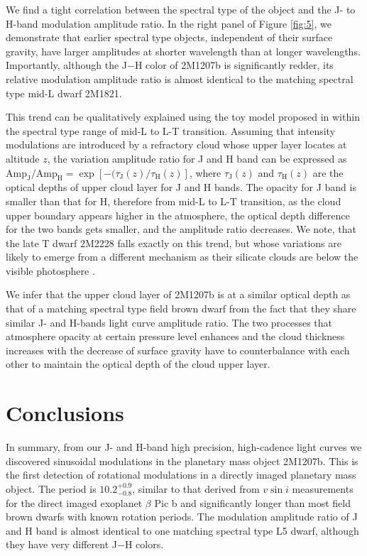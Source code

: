 \documentclass[apj]{emulateapj}
\newcommand{\bpic}{$\beta$ Pic}
\newcommand{\vsini}{$v\sin i$}
\begin{document}
We find a tight correlation between the spectral type of the object
and the J- to H-band modulation amplitude ratio. In the right panel of
Figure \ref{fig:5}, we demonstrate that earlier spectral type objects,
independent of their surface gravity, have larger amplitudes at
shorter wavelength than at longer wavelengths. Importantly, although
the J$-$H color of 2M1207b is significantly redder, its relative
modulation amplitude ratio is almost identical to the matching
spectral type mid-L dwarf 2M1821.

{\color{red}This trend can be qualitatively explained using the toy model proposed
in \cite{Yang2014} within the spectral type range of mid-L to L-T
transition. Assuming that intensity modulations are introduced by a
refractory cloud whose upper layer locates at altitude $z$, the
variation amplitude ratio for J and H band can be expressed as
$\mathrm{Amp_{J}}/\mathrm{Amp_{H}} =
\exp\left[-(\tau_{\mathrm{J}}(z)/\tau_{{\mathrm{H}}}(z)\right]$,
where $\tau_{\mathrm{J}}(z)$ and $\tau_{\mathrm{H}}(z)$ are the
optical depths of upper cloud layer for J and H bands. The opacity for
J band is smaller than that for H, therefore from mid-L to L-T
transition, as the cloud upper boundary appears higher in the
atmosphere, the optical depth difference for the two bands gets
smaller, and the amplitude ratio decreases.  We note, that the late T
dwarf 2M2228 falls exactly on this trend, but whose variations are
likely to emerge from a different mechanism as their silicate clouds
are below the visible photosphere \citep[e.g.][]{Stephens2009}.

We infer that the upper cloud layer of 2M1207b is at a similar optical
depth as that of a matching spectral type field brown dwarf from the fact
that they share similar J- and H-bands light curve amplitude ratio.
The
two processes that atmosphere opacity at certain pressure level
enhances and the cloud thickness increases with the decrease of surface
gravity have to counterbalance with each other to maintain the optical
depth of the cloud upper layer.}

\section{Conclusions}
In summary, from our J- and H-band high precision, high-cadence light
curves we discovered sinusoidal modulations in the planetary mass
object 2M1207b. This is the first detection of rotational modulations
in a directly imaged planetary mass object.  The period is
$10.2^{+0.9}_{-0.8}$, similar to that derived from \vsini{} 
measurements for the direct imaged exoplanet \bpic{} b and
significantly longer than most field brown dwarfs with known rotation
periods. The modulation amplitude ratio of J and H band is almost
identical to one matching spectral type L5 dwarf, although they have
very different J$-$H colors.
\end{document}
